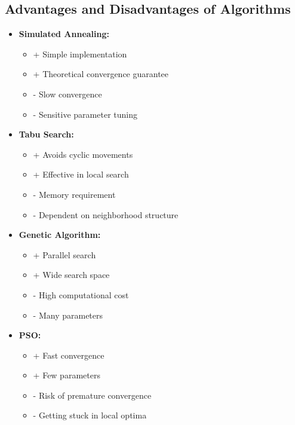 
\subsection{Advantages and Disadvantages of Algorithms}

\begin{tcolorbox}[title=Comparative Analysis]
\begin{itemize}
    \item \textbf{Simulated Annealing:}
        \begin{itemize}
            \item + Simple implementation
            \item + Theoretical convergence guarantee
            \item - Slow convergence
            \item - Sensitive parameter tuning
        \end{itemize}
    \item \textbf{Tabu Search:}
        \begin{itemize}
            \item + Avoids cyclic movements
            \item + Effective in local search
            \item - Memory requirement
            \item - Dependent on neighborhood structure
        \end{itemize}
    \item \textbf{Genetic Algorithm:}
        \begin{itemize}
            \item + Parallel search
            \item + Wide search space
            \item - High computational cost
            \item - Many parameters
        \end{itemize}
    \item \textbf{PSO:}
        \begin{itemize}
            \item + Fast convergence
            \item + Few parameters
            \item - Risk of premature convergence
            \item - Getting stuck in local optima
        \end{itemize}
\end{itemize}
\end{tcolorbox}

